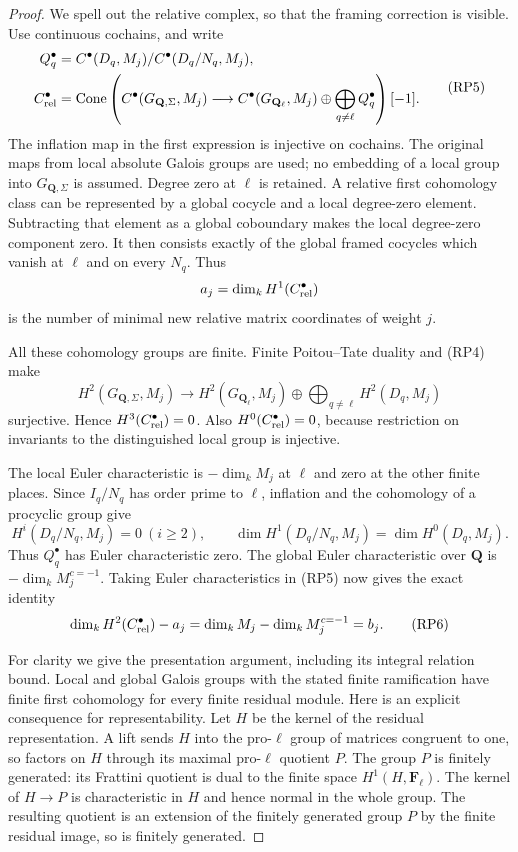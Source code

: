 \begin{proof}
We spell out the relative complex, so that the framing correction is
visible.  Use continuous cochains, and write
\[
 \begin{aligned}
 Q_q^\bullet&=
 C^\bullet(D_q,M_j)/C^\bullet(D_q/N_q,M_j),
 \\
 C_{\rm rel}^\bullet&=
 \operatorname{Cone}\left(
 C^\bullet(G_{\mathbf Q,\Sigma},M_j)
 \longrightarrow C^\bullet(G_{\mathbf Q_\ell},M_j)
                  \oplus\bigoplus_{q\ne\ell}Q_q^\bullet
                         \right)[-1].
 \end{aligned}                                                \tag{RP5}
\]
The inflation map in the first expression is injective on cochains.
The original maps from local absolute Galois groups are used; no
embedding of a local group into $G_{\mathbf Q,\Sigma}$ is assumed.
Degree zero at $\ell$ is retained.  A relative first cohomology class
can be represented by a global cocycle and a local degree-zero
element.  Subtracting that element as a global coboundary makes the
local degree-zero component zero.  It then consists exactly of the
global framed cocycles which vanish at $\ell$ and on every $N_q$.
Thus
\[
 a_j=\dim_kH^1(C_{\rm rel}^\bullet)
\]
is the number of minimal new relative matrix coordinates of weight $j$.

All these cohomology groups are finite.  Finite Poitou--Tate duality
and (RP4) make \cite{AuxTowerDuality}
\[
 H^2(G_{\mathbf Q,\Sigma},M_j)\longrightarrow
 H^2(G_{\mathbf Q_\ell},M_j)
              \oplus\bigoplus_{q\ne\ell}H^2(D_q,M_j)
\]
surjective.  Hence $H^3(C_{\rm rel}^\bullet)=0$.
Also $H^0(C_{\rm rel}^\bullet)=0$, because restriction on invariants
to the distinguished local group is injective.

The local Euler characteristic is $-\dim_kM_j$ at $\ell$ and
zero at the other finite places.  Since $I_q/N_q$ has order prime
to $\ell$, inflation and the cohomology of a procyclic group give
\[
 H^i(D_q/N_q,M_j)=0\ (i\ge2),\qquad
 \dim H^1(D_q/N_q,M_j)=\dim H^0(D_q,M_j).
\]
Thus $Q_q^\bullet$ has Euler characteristic zero.  The global
Euler characteristic over $\mathbf Q$ is $-\dim_kM_j^{c=-1}$.
Taking Euler characteristics in (RP5) now gives the exact identity
\[
 \dim_kH^2(C_{\rm rel}^\bullet)-a_j
       =\dim_kM_j-\dim_kM_j^{c=-1}=b_j.                        \tag{RP6}
\]

For clarity we give the presentation argument, including its integral
relation bound.  Local and global Galois groups with the stated finite
ramification have finite first cohomology for every finite residual
module.  Here is an explicit consequence for representability.
Let $H$ be the kernel of the residual representation.  A lift sends
$H$ into the pro-$\ell$ group of matrices congruent to one, so factors
on $H$ through its maximal pro-$\ell$ quotient $P$.
The group $P$ is finitely generated: its Frattini quotient is dual to
the finite space $H^1(H,\mathbf F_\ell)$.  The kernel of $H\to P$
is characteristic in $H$ and hence normal in the whole group.
The resulting quotient is an extension of the finitely generated
group $P$ by the finite residual image, so is finitely generated.


\end{proof}
